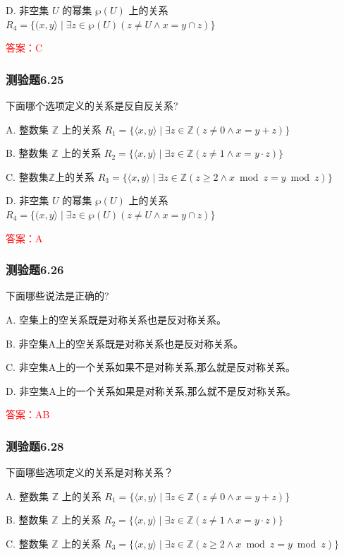 \documentclass[UTF8, heading=true]{ctexart}
\begin{document}
D. 
非空集 $U$ 的幂集 $\wp(U)$ 上的关系 $R_4=\{(x, y\rangle \mid \exists z \in \wp(U)(z \neq U \wedge x=y \cap z)\}$

\textcolor{red}{答案：C}

\subsubsection{测验题6.25}
下面哪个选项定义的关系是反自反关系?

A. 整数集 $\mathbb{Z}$ 上的关系 $R_1=\{\langle x, y\rangle \mid \exists z \in \mathbb{Z}(z \neq 0 \wedge x=y+z)\}$

B. 整数集 $\mathbb{Z}$ 上的关系 $R_2=\{\langle x, y\rangle \mid \exists z \in \mathbb{Z}(z \neq 1 \wedge x=y \cdot z)\}$

C. 整数集$\mathbb{Z}$上的关系 $R_3=\{\langle x, y\rangle \mid \exists z \in \mathbb{Z}(z \geq 2 \wedge x \bmod z=y \bmod z)\}$

D. 非空集 $U$ 的幂集 $\wp(U)$ 上的关系 $R_4=\{(x, y\rangle \mid \exists z \in \wp(U)(z \neq U \wedge x=y \cap z)\}$

\textcolor{red}{答案：A}

\subsubsection{测验题6.26}

下面哪些说法是正确的?

A. 空集上的空关系既是对称关系也是反对称关系。

B. 非空集A上的空关系既是对称关系也是反对称关系。

C. 非空集A上的一个关系如果不是对称关系,那么就是反对称关系。

D. 非空集A上的一个关系如果是对称关系,那么就不是反对称关系。

\textcolor{red}{答案：AB}

\subsubsection{测验题6.28}

下面哪些选项定义的关系是对称关系？

A. 整数集 $\mathbb{Z}$ 上的关系 $R_1=\{\langle x, y\rangle \mid \exists z \in \mathbb{Z}(z \neq 0 \wedge x=y+z)\}$

B. 整数集 $\mathbb{Z}$ 上的关系 $R_2=\{\langle x, y\rangle \mid \exists z \in \mathbb{Z}(z \neq 1 \wedge x=y \cdot z)\}$

C. 整数集 $\mathbb{Z}$ 上的关系 $R_3=\{\langle x, y\rangle \mid \exists z \in \mathbb{Z}(z \geq 2 \wedge x \bmod z=y \bmod z)\}$
\end{document}
